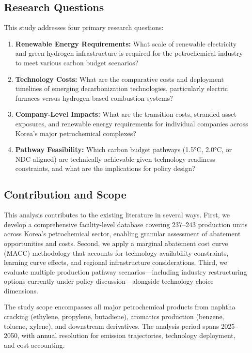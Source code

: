 \documentclass[12pt,a4paper]{article}
\begin{document}
\subsection{Research Questions}

This study addresses four primary research questions:

\begin{enumerate}
\item \textbf{Renewable Energy Requirements:} What scale of renewable electricity and green hydrogen infrastructure is required for the petrochemical industry to meet various carbon budget scenarios?

\item \textbf{Technology Costs:} What are the comparative costs and deployment timelines of emerging decarbonization technologies, particularly electric furnaces versus hydrogen-based combustion systems?

\item \textbf{Company-Level Impacts:} What are the transition costs, stranded asset exposures, and renewable energy requirements for individual companies across Korea's major petrochemical complexes?

\item \textbf{Pathway Feasibility:} Which carbon budget pathways (1.5°C, 2.0°C, or NDC-aligned) are technically achievable given technology readiness constraints, and what are the implications for policy design?
\end{enumerate}

\subsection{Contribution and Scope}

This analysis contributes to the existing literature in several ways. First, we develop a comprehensive facility-level database covering 237--243 production units across Korea's petrochemical sector, enabling granular assessment of abatement opportunities and costs. Second, we apply a marginal abatement cost curve (MACC) methodology that accounts for technology availability constraints, learning curve effects, and regional infrastructure considerations. Third, we evaluate multiple production pathway scenarios---including industry restructuring options currently under policy discussion---alongside technology choice dimensions.

The study scope encompasses all major petrochemical products from naphtha cracking (ethylene, propylene, butadiene), aromatics production (benzene, toluene, xylene), and downstream derivatives. The analysis period spans 2025--2050, with annual resolution for emission trajectories, technology deployment, and cost accounting.
\end{document}
